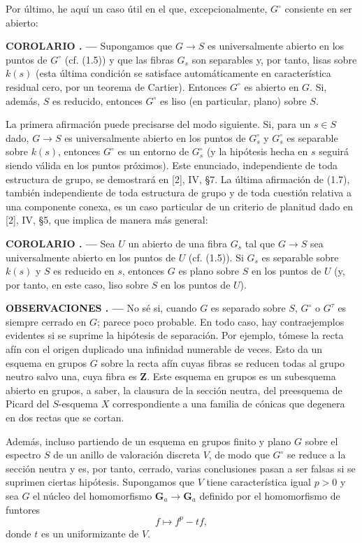 \documentclass[11pt,twoside,openany]{book}
\numberwithin{equation}{section}
\newcommand{\src}[1]{%
  \phantomsection\hypertarget{src:#1}{}%
  \marginpar{\raggedleft\footnotesize\sffamily #1}%
}
\theoremstyle{plain}
\theoremstyle{definition}
\theoremstyle{remark}
\newcommand{\result}[2]{%
  \par\medskip\noindent\textbf{#1%
  \if\relax\detokenize{#2}\relax\else\space#2\fi. ---}\enspace
}
\newcommand{\FgaUnitKey}{frontmatter}
\renewcommand{\src}[1]{%
  \phantomsection\hypertarget{src:\FgaUnitKey:#1}{}%
  \marginpar{\raggedleft\footnotesize\sffamily #1}%
}
\theoremstyle{plain}
\theoremstyle{definition}
\theoremstyle{remark}
\begin{document}
\src{229}
Por último, he aquí un caso útil en el que, excepcionalmente, $G^\circ$
consiente en ser abierto:

\result{COROLARIO}{1.7} Supongamos que $G\longrightarrow S$ es universalmente
abierto en los puntos de $G^\circ$ (cf. (1.5)) y que las fibras $G_s$ son
separables y, por tanto, lisas sobre $k(s)$ (esta última condición se satisface
automáticamente en característica residual cero, por un teorema de Cartier).
Entonces $G^\circ$ es abierto en $G$. Si, además, $S$ es reducido, entonces
$G^\circ$ es liso (en particular, plano) sobre $S$.

La primera afirmación puede precisarse del modo siguiente. Si, para un
$s\in S$ dado, $G\longrightarrow S$ es universalmente abierto en los puntos de
$G_s^\circ$ y $G_s^\circ$ es separable sobre $k(s)$, entonces $G^\circ$ es un
entorno de $G_s^\circ$ (y la hipótesis hecha en $s$ seguirá siendo válida en
los puntos próximos). Este enunciado, independiente de toda estructura de
grupo, se demostrará en [2], IV, §7. La última afirmación de (1.7), también
independiente de toda estructura de grupo y de toda cuestión relativa a una
componente conexa, es un caso particular de un criterio de planitud dado en
[2], IV, §5, que implica de manera más general:

\result{COROLARIO}{1.8} Sea $U$ un abierto de una fibra $G_s$ tal que
$G\longrightarrow S$ sea universalmente abierto en los puntos de $U$ (cf.
(1.5)). Si $G_s$ es separable sobre $k(s)$ y $S$ es reducido en $s$, entonces
$G$ es plano sobre $S$ en los puntos de $U$ (y, por tanto, en este caso, liso
sobre $S$ en los puntos de $U$).

\result{OBSERVACIONES}{1.9} No sé si, cuando $G$ es separado sobre $S$,
$G^\circ$ o $G^\tau$ es siempre cerrado en $G$; parece poco probable. En todo
caso, hay contraejemplos evidentes si se suprime la hipótesis de separación.
Por ejemplo, tómese la recta afín con el origen duplicado una infinidad
numerable de veces. Esto da un esquema en grupos $G$ sobre la recta afín cuyas
fibras se reducen todas al grupo neutro salvo una, cuya fibra es $\mathbf Z$.
Este esquema en grupos es un subesquema abierto en grupos, a saber, la clausura
de la sección neutra, del preesquema de Picard del $S$-esquema $X$
correspondiente a una familia de cónicas que degenera en dos rectas que se
cortan.

Además, incluso partiendo de un esquema en grupos finito y plano $G$ sobre el
espectro $S$ de un anillo de valoración discreta $V$, de modo que $G^\circ$ se
reduce a la sección neutra y es, por tanto, cerrado, varias conclusiones pasan
a ser falsas si se suprimen ciertas hipótesis. Supongamos que $V$ tiene
característica igual $p>0$ y sea $G$ el núcleo del homomorfismo
$\mathbf G_a\longrightarrow\mathbf G_a$ definido por el homomorfismo de
funtores
\[
f\longmapsto f^p-tf,
\]
donde $t$ es un uniformizante de $V$.
\end{document}
